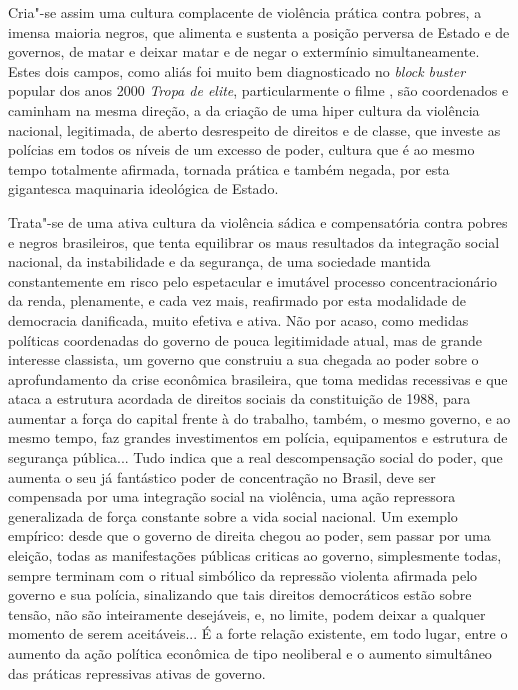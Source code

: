 Cria"-se assim uma cultura complacente de violência prática contra
pobres, a imensa maioria negros, que alimenta e sustenta a posição
perversa de Estado e de governos, de matar e deixar matar e de negar o
extermínio simultaneamente. Estes dois campos, como aliás foi muito bem
diagnosticado no \emph{block} \emph{buster} popular dos anos 2000
\emph{Tropa de elite}, particularmente o filme , são coordenados e
caminham na mesma direção, a da criação de uma hiper cultura da
violência nacional, legitimada, de aberto desrespeito de direitos e de
classe, que investe as polícias em todos os níveis de um excesso de
poder, cultura que é ao mesmo tempo totalmente afirmada, tornada prática
e também negada, por esta gigantesca maquinaria ideológica de Estado.

Trata"-se de uma ativa cultura da violência sádica e compensatória contra
pobres e negros brasileiros, que tenta equilibrar os maus resultados da
integração social nacional, da instabilidade e da segurança, de uma
sociedade mantida constantemente em risco pelo espetacular e imutável
processo concentracionário da renda, plenamente, e cada vez mais,
reafirmado por esta modalidade de democracia danificada, muito efetiva e
ativa. Não por acaso, como medidas políticas coordenadas do governo de
pouca legitimidade atual, mas de grande interesse classista, um governo
que construiu a sua chegada ao poder sobre o aprofundamento da crise
econômica brasileira, que toma medidas recessivas e que ataca a
estrutura acordada de direitos sociais da constituição de 1988, para
aumentar a força do capital frente à do trabalho, também, o mesmo
governo, e ao mesmo tempo, faz grandes investimentos em polícia,
equipamentos e estrutura de segurança pública... Tudo indica que a real
descompensação social do poder, que aumenta o seu já fantástico poder de
concentração no Brasil, deve ser compensada por uma integração social na
violência, uma ação repressora generalizada de força constante sobre a
vida social nacional. Um exemplo empírico: desde que o governo de
direita chegou ao poder, sem passar por uma eleição, todas as
manifestações públicas criticas ao governo, simplesmente todas, sempre
terminam com o ritual simbólico da repressão violenta afirmada pelo
governo e sua polícia, sinalizando que tais direitos democráticos estão
sobre tensão, não são inteiramente desejáveis, e, no limite, podem
deixar a qualquer momento de serem aceitáveis... É a forte relação
existente, em todo lugar, entre o aumento da ação política econômica de
tipo neoliberal e o aumento simultâneo das práticas repressivas ativas
de governo.

